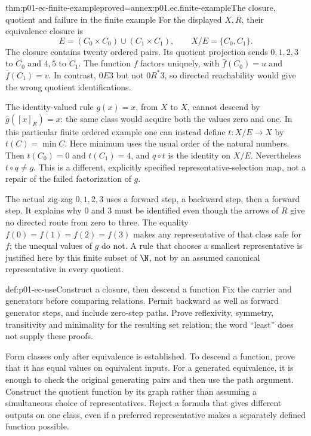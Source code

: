 \begin{hbtheorem}{thm:p01-ec-finite-example}{proved=annex:p01.ec.finite-example}{The closure, quotient and failure in the finite example}
For the displayed \(X,R\), their equivalence closure is
\[
 E=(C_0\times C_0)\cup(C_1\times C_1),\qquad
 X/E=\{C_0,C_1\}.
\]
The closure contains twenty ordered pairs. Its quotient projection sends
\(0,1,2,3\) to \(C_0\) and \(4,5\) to \(C_1\). The function
\(f\) factors uniquely, with \(\bar f(C_0)=u\) and
\(\bar f(C_1)=v\). In contrast, \(0E3\) but not \(0R^*3\),
so directed reachability would give the wrong quotient identifications.

The identity-valued rule \(g(x)=x\), from \(X\) to \(X\), cannot
descend by \(\bar g([x]_E)=x\): the same class would acquire both
the values zero and one. In this particular finite ordered example one
can instead define \(t:X/E\to X\) by \(t(C)=\min C\).
Here minimum uses the usual order of the natural numbers.
Then \(t(C_0)=0\) and
\(t(C_1)=4\), and \(q\circ t\) is the identity on \(X/E\).
Nevertheless \(t\circ q\ne g\). This is a different, explicitly
specified representative-selection map, not a repair of the failed
factorization of \(g\).
\end{hbtheorem}

The actual zig-zag \(0,1,2,3\) uses a forward step, a backward step,
then a forward step. It explains why \(0\) and \(3\) must be identified
even though the arrows of \(R\) give no directed route from zero to three.
The equality \(f(0)=f(1)=f(2)=f(3)\) makes any representative of that
class safe for \(f\); the unequal values of \(g\) do not. A rule that
chooses a smallest representative is justified here by this finite subset
of \(\N\), not by an assumed canonical representative in every quotient.

\begin{hbmethod}{def:p01-ec-use}{Construct a closure, then descend a function}
Fix the carrier and generators before comparing relations. Permit backward
as well as forward generator steps, and include zero-step paths. Prove
reflexivity, symmetry, transitivity and minimality for the resulting set
relation; the word ``least'' does not supply these proofs.

Form classes only after equivalence is established. To descend a function,
prove that it has equal values on equivalent inputs. For a generated
equivalence, it is enough to check the original generating pairs and then
use the path argument. Construct the quotient function by its graph rather
than assuming a simultaneous choice of representatives. Reject a formula
that gives different outputs on one class, even if a preferred representative
makes a separately defined function possible.
\end{hbmethod}
